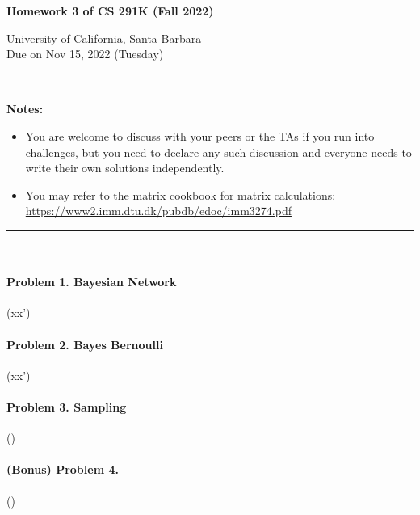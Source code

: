 \documentclass[11pt]{article}\pagestyle{plain}
\begin{document}
\begin{center}\textbf{{\LARGE Homework 3 of CS 291K (Fall 2022)}\\[.3in]}

{\large University of California, Santa Barbara}\\[.3in]
{\large Due on Nov 15, 2022 (Tuesday)}\\[.1in]
\end{center}
\rule[-10pt]{16.5cm}{0.05em} \\ 
\newline
\textbf{Notes:}
\vspace{-1em}
\begin{itemize}
\item You are welcome to discuss with your peers or the TAs if you run into challenges, but you need to declare any such discussion and everyone needs to write their own solutions independently.
\item You may refer to the matrix cookbook for matrix calculations: \url{https://www2.imm.dtu.dk/pubdb/edoc/imm3274.pdf}
\end{itemize}
\vspace{-2em}
\rule[-10pt]{16.5cm}{0.05em} \\


\paragraph{Problem 1. Bayesian Network}  (xx') 




\paragraph{Problem 2. Bayes Bernoulli} (xx')



\paragraph{Problem 3. Sampling} ()



\paragraph{(Bonus) Problem 4. } ()
\end{document}
